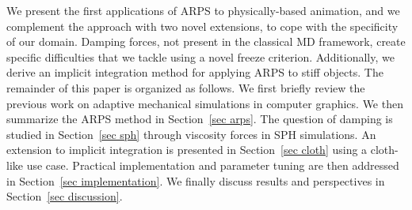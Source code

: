 \documentclass[11pt, oneside, a4paper]{memoir}
\begin{document}
We present the first applications of ARPS to physically-based animation, and we complement the approach with two novel extensions, to cope with the specificity of our domain.
Damping forces, not present in the classical MD framework, create specific difficulties that we tackle using a novel freeze criterion.
Additionally, we derive an implicit integration method for applying ARPS to stiff objects.
The remainder of this paper is organized as follows.
We first briefly review the previous work on adaptive mechanical simulations in computer graphics.
We then summarize the ARPS method in Section~\ref{sec arps}.
The question of damping is studied in Section~\ref{sec sph} through viscosity forces in SPH simulations.
An extension to implicit integration is presented in Section~\ref{sec cloth} using a cloth-like use case.
Practical implementation and parameter tuning are then addressed in Section~\ref{sec implementation}. We finally discuss results and perspectives in Section~\ref{sec discussion}.
\end{document}
